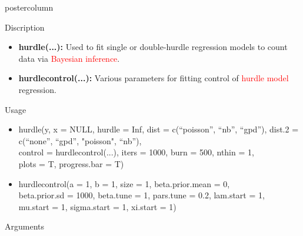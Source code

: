 \documentclass[final]{beamer}\usepackage[]{graphicx}\usepackage[]{color}
\newcommand{\red}{\textcolor{red}}
\begin{document}
{\begin{frame}
\begin{columns}
\begin{column}{.33\textwidth}
\begin{beamercolorbox}[center,wd=\textwidth]{postercolumn}
\begin{minipage}[T]{.97\textwidth}
{\begin{block}{Discription}
\begin{itemize}
	\item \textbf{hurdle(...):} Used to fit single or double-hurdle regression models to count data via \red{Bayesian inference}.
  \vspace{0.75cm}
	\item \textbf{hurdle\textunderscore control(...):} Various parameters for fitting control of \red{hurdle model} regression.
\end{itemize}
	\vspace{-0.25cm}
	
\end{block}
\vfill


\begin{block}{Usage}

\begin{itemize}
	\item hurdle(y, x = NULL, hurdle = Inf,
	dist = c(``poisson'', ``nb'', ``gpd''),
	dist.2 = c(``none'', ``gpd'', "poisson", ``nb''),\\
	control = hurdle\textunderscore control(...),
	iters = 1000, burn = 500, nthin = 1,
	\\plots = T, progress.bar = T)
\begin{center}
	\vspace{-0.5cm}
\end{center}
	\item hurdle\textunderscore control(a = 1, b = 1, size = 1, beta.prior.mean = 0, \\beta.prior.sd = 1000, beta.tune = 1, pars.tune = 0.2,
	lam.start = 1, \\mu.start = 1,
	sigma.start = 1, xi.start = 1)
\end{itemize}
\vspace{-0.25cm}

\end{block}
\vfill

\begin{block}{Arguments}



\end{block}}
\end{minipage}
\end{beamercolorbox}
\end{column}
\end{columns}
\end{frame}}
\end{document}
